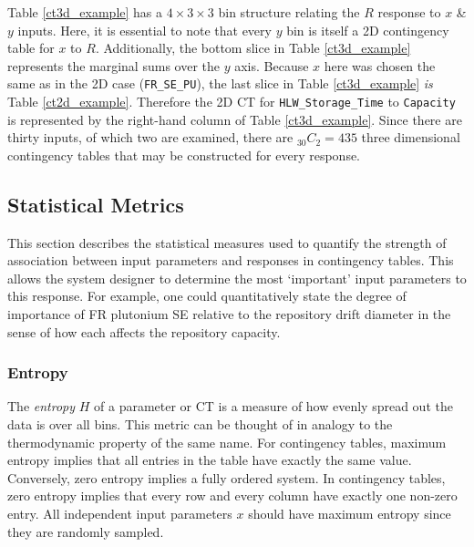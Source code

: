 \documentclass[a4paper, 12pt]{article}
\begin{document}


Table \ref{ct3d_example} has a $4\times 3\times 3$ bin structure relating the $R$ response to $x$ \& $y$ inputs.  Here, it is essential to note that every $y$ bin
is itself a 2D contingency table for $x$ to $R$.
Additionally, the bottom slice in Table \ref{ct3d_example} represents the marginal sums over the $y$ axis.  Because $x$ here was chosen the same as in the
2D case (\texttt{FR\_SE\_PU}), the last slice in Table \ref{ct3d_example} \emph{is} Table \ref{ct2d_example}.  Therefore the 2D CT for \texttt{HLW\_Storage\_Time}
to \texttt{Capacity} is represented by the right-hand column of Table \ref{ct3d_example}.
Since there are thirty inputs, of which two are examined, there are $_{30}C_2 = 435$ three dimensional contingency tables that may be constructed for every response.


\subsection{Statistical Metrics}
\label{sec:statistical_metrics}

This section describes the statistical measures used to quantify the strength of association between input parameters and responses in contingency tables.
This allows the system designer to determine the most `important' input parameters to this response.  For example, one
could quantitatively state the degree of importance of FR plutonium SE relative to the repository drift diameter in the sense of how each affects the repository capacity.

\subsubsection{Entropy}
\label{sec:entropy}

The \emph{entropy} $H$ of a parameter or CT is a measure of how evenly spread out the data is over all bins.  This metric can be thought of
in analogy to the thermodynamic property of the same name.  For contingency tables,
maximum entropy implies that all entries in the table have exactly the same value.
Conversely, zero entropy implies a fully ordered system.  In contingency tables, zero entropy implies that every row and every column have exactly one
non-zero entry.  All independent input parameters $x$ should have maximum entropy since they are randomly sampled.
\end{document}

